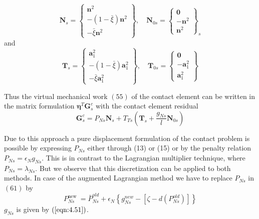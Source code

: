 \begin{equation}
\label{eqn:4.59}
\mathbf{N}_{s}=\left\{\begin{array}{c}\mathbf{n}^{2} \\ -(1-\bar{\xi}) \mathbf{n}^{2} \\ -\bar{\xi} \mathbf{n}^{2}\end{array}\right\}, \quad
 \mathbf{N}_{0 s}=\left\{\begin{array}{c}\mathbf{0} \\ -\mathbf{n}^{2} \\ \mathbf{n}^{2}\end{array}\right\}_{s} 
\end{equation}
and
\begin{equation}
\label{eqn:4.60}
\mathbf{T}_{s}=\left\{\begin{array}{c}
\mathbf{a}_{1}^{2} \\
-(1-\bar{\xi}) \mathbf{a}_{1}^{2} \\
-\bar{\xi} \mathbf{a}_{1}^{2}
\end{array}\right\}, \quad \mathbf{T}_{0 s}=\left\{\begin{array}{c}
\mathbf{0} \\
-\mathbf{a}_{1}^{2} \\
\mathbf{a}_{1}^{2}
\end{array}\right\}
\end{equation}

Thus the virtual mechanical work $ (55) $ of the contact element can be written in the matrix formulation $ \boldsymbol{\eta}^{T} \mathbf{G}_{s}^{c} $ with the contact element residual
\begin{equation}
\label{eqn:4.61}
\mathbf{G}_{s}^{c}=P_{N s} \mathbf{N}_{s}+T_{T s}\left(\mathbf{T}_{s}+\frac{g_{N s}}{l} \mathbf{N}_{0 s}\right)
\end{equation}

Due to this approach a pure displacement formulation of the contact problem is possible by expressing $ P_{N s} $ either through (13) or (15) or by the penalty relation $ P_{N s}=\epsilon_{N} g_{N s} $. This is in contrast to the Lagrangian multiplier technique, where $ P_{N s}=\lambda_{N s} . $ But we observe that this discretization can be applied to both methods. In case of the augmented Lagrangian method we have to replace $ P_{N s} $ in $ (61) $ by
\begin{equation}
\label{eqn:4.62}
 P_{N s}^{\text {new }}=\bar{P}_{N s}^{o l d}+\epsilon_{N}\left\{g_{N s}^{n e w}-\left[\zeta-d\left(P_{N s}^{o l d}\right)\right]\right\} 
\end{equation}
 $ g_{N s} $ is given by $ (\ref{eqn:4.51}) $. 

